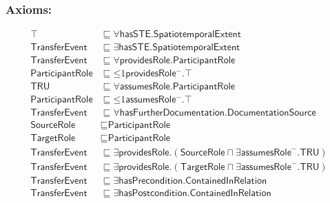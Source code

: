 \subsubsection*{Axioms:}
\begin{align}
    \top &\sqsubseteq \forall\textsf{hasSTE.SpatiotemporalExtent}\\
    \textsf{TransferEvent} &\sqsubseteq \exists\textsf{hasSTE.SpatiotemporalExtent}\\
    \textsf{TransferEvent} &\sqsubseteq \forall\textsf{providesRole.ParticipantRole}\\
    \textsf{ParticipantRole} &\sqsubseteq \mathord{\leq} 1 \textsf{providesRole}\mathord{^-}.\top\\
    \textsf{TRU} &\sqsubseteq \forall\textsf{assumesRole.ParticipantRole}\\
    \textsf{ParticipantRole} &\sqsubseteq \mathord{\leq} 1 \textsf{assumesRole}\mathord{^-}.\top\\
    \textsf{TransferEvent} &\sqsubseteq \forall\textsf{hasFurtherDocumentation.DocumentationSource} \\
    \textsf{SourceRole} &\sqsubseteq \textsf{ParticipantRole}\\
    \textsf{TargetRole} &\sqsubseteq \textsf{ParticipantRole}\\
    \textsf{TransferEvent} &\sqsubseteq \exists\textsf{providesRole}.(\textsf{SourceRole} \sqcap \exists \textsf{assumesRole}^-.\textsf{TRU})\\
    \textsf{TransferEvent} &\sqsubseteq \exists\textsf{providesRole}.(\textsf{TargetRole} \sqcap \exists \textsf{assumesRole}^-.\textsf{TRU})\\
    \textsf{TransferEvent} &\sqsubseteq \exists\textsf{hasPrecondition.ContainedInRelation}\\
    \textsf{TransferEvent} &\sqsubseteq \exists\textsf{hasPostcondition.ContainedInRelation}
\end{align}

